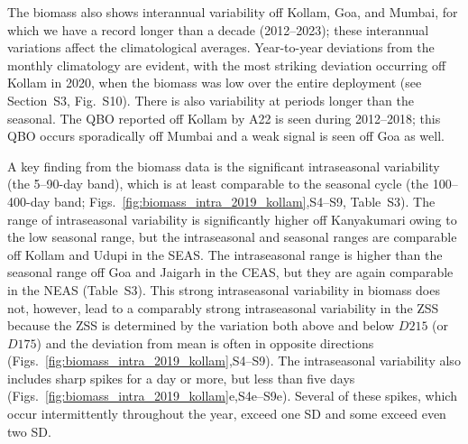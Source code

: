 \documentclass[authoryear,review,11pt]{elsarticle}
\begin{document}
The biomass also shows interannual variability off Kollam, Goa, and Mumbai, for which we have a record longer than a decade (2012--2023); these interannual variations affect the climatological averages. Year-to-year deviations from the monthly climatology are evident, with the most striking deviation occurring off Kollam in 2020, when the biomass was low over the entire deployment (see Section~S3, Fig.~S10). There is also variability at periods longer than the seasonal. The QBO reported off Kollam by A22 is seen during 2012--2018; this QBO occurs sporadically off Mumbai and a weak signal is seen off Goa as well. 

A key finding from the biomass data is the significant intraseasonal variability (the 5--90-day band), which is at least comparable to the seasonal cycle (the 100--400-day band; Figs.~\ref{fig:biomass_intra_2019_kollam},S4--S9, Table~S3). The range of intraseasonal variability is significantly higher off Kanyakumari owing to the low seasonal range, but the intraseasonal and seasonal ranges are comparable off Kollam and Udupi in the SEAS.  The intraseasonal range is higher than the seasonal range off Goa and Jaigarh in the CEAS, but they are again comparable in the NEAS (Table~S3). This strong intraseasonal variability in biomass does not, however, lead to a comparably strong intraseasonal variability in the ZSS because the ZSS is determined by the variation both above and below $D215$ (or $D175$) and the deviation from mean is often in opposite directions (Figs.~\ref{fig:biomass_intra_2019_kollam},S4--S9). The intraseasonal variability also includes sharp spikes for a day or more, but less than five days (Figs.~\ref{fig:biomass_intra_2019_kollam}e,S4e--S9e).  Several of these spikes, which occur intermittently throughout the year, exceed one SD and some exceed even two SD.

 

\end{document}
